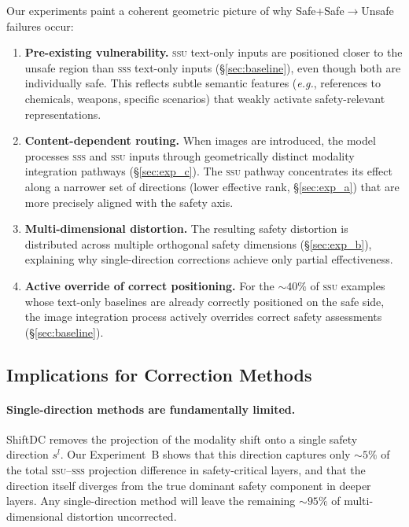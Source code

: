 \documentclass{article}
\newcommand{\ssu}{\textsc{ssu}}
\newcommand{\sss}{\textsc{sss}}
\newcommand{\eg}{\emph{e.g.}}
\begin{document}
Our experiments paint a coherent geometric picture of why Safe+Safe$\to$Unsafe
failures occur:

\begin{enumerate}
  \item \textbf{Pre-existing vulnerability.}  \ssu{} text-only inputs are
        positioned closer to the unsafe region than \sss{} text-only inputs
        (\S\ref{sec:baseline}), even though both are individually safe.  This
        reflects subtle semantic features (\eg, references to chemicals, weapons,
        specific scenarios) that weakly activate safety-relevant representations.

  \item \textbf{Content-dependent routing.}  When images are introduced, the
        model processes \sss{} and \ssu{} inputs through geometrically distinct
        modality integration pathways (\S\ref{sec:exp_c}).  The \ssu{} pathway
        concentrates its effect along a narrower set of directions (lower
        effective rank, \S\ref{sec:exp_a}) that are more precisely aligned with
        the safety axis.

  \item \textbf{Multi-dimensional distortion.}  The resulting safety distortion
        is distributed across multiple orthogonal safety dimensions
        (\S\ref{sec:exp_b}), explaining why single-direction corrections achieve
        only partial effectiveness.

  \item \textbf{Active override of correct positioning.}  For the ${\sim}40\%$
        of \ssu{} examples whose text-only baselines are already correctly
        positioned on the safe side, the image integration process actively
        overrides correct safety assessments (\S\ref{sec:baseline}).
\end{enumerate}

\subsection{Implications for Correction Methods}

\paragraph{Single-direction methods are fundamentally limited.}
ShiftDC removes the projection of the modality shift onto a single safety
direction $s^l$.  Our Experiment~B shows that this direction captures only
${\sim}5\%$ of the total \ssu--\sss{} projection difference in safety-critical
layers, and that the direction itself diverges from the true dominant safety
component in deeper layers.  Any single-direction method will leave the remaining
${\sim}95\%$ of multi-dimensional distortion uncorrected.
\end{document}
